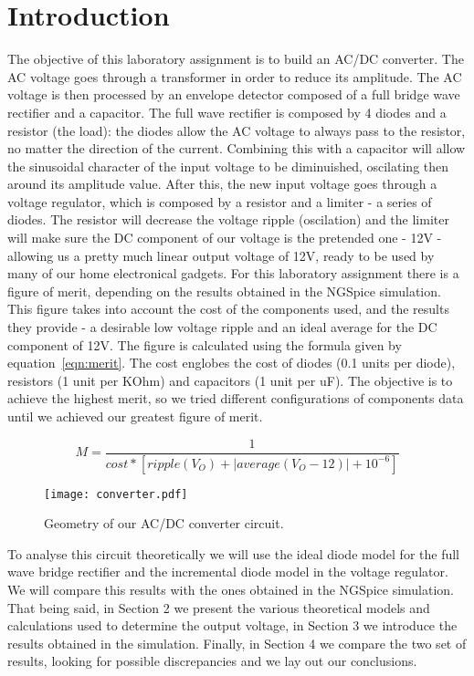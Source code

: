 \section{Introduction}
\label{sec:introduction}
The objective of this laboratory assignment is to build an AC/DC converter. The AC voltage goes through a transformer in order to reduce its amplitude. The AC voltage is then processed by an envelope detector composed of a full bridge wave rectifier and a capacitor. The full wave rectifier is composed by 4 diodes and a resistor (the load): the diodes allow the AC voltage to always pass to the resistor, no matter the direction of the current. Combining this with a capacitor will allow the sinusoidal character of the input voltage to be diminuished, oscilating then around its amplitude value. After this, the new input voltage goes through a voltage regulator, which is composed by a resistor and a limiter - a series of diodes. The resistor will decrease the voltage ripple (oscilation) and the limiter will make sure the DC component of our voltage is the pretended one - 12V - allowing us a pretty much linear output voltage of 12V, ready to be used by many of our home electronical gadgets.
For this laboratory assignment there is a figure of merit, depending on the results obtained in the NGSpice simulation. This figure takes into account the cost of the components used, and the results they provide - a desirable low voltage ripple and an ideal average for the DC component of 12V. The figure is calculated using the formula given by equation~\ref{eqn:merit}. The cost englobes the cost of diodes (0.1 units per diode), resistors (1 unit per KOhm) and capacitors (1 unit per uF). The objective is to achieve the highest merit, so we tried different configurations of components data until we achieved our greatest figure of merit.

\begin{equation}
\label{eqn:merit}
M=\frac{1}{cost*[ripple(V_O) + |average(V_O - 12)| + 10^{-6}]}
\end{equation}

\begin{figure}[h] \centering
\texttt{[image: converter.pdf]}
\caption{Geometry of our AC/DC converter circuit.}
\end{figure}

To analyse this circuit theoretically we will use the ideal diode model for the full wave bridge rectifier and the incremental diode model in the voltage regulator. We will compare this results with the ones obtained in the NGSpice simulation.
That being said, in Section 2 we present the various theoretical models and calculations used to determine the output voltage, in Section 3 we introduce the results obtained in the simulation. Finally, in Section 4 we compare the two set of results, looking for possible discrepancies and we lay out our conclusions.

